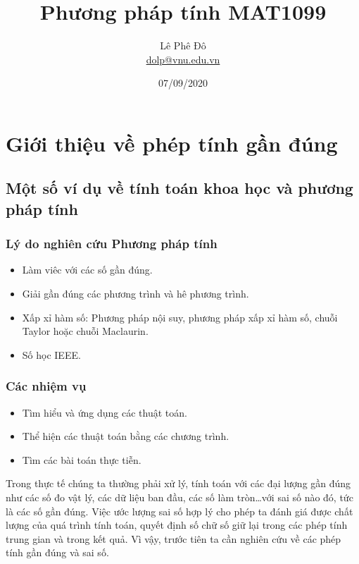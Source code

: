 \documentclass{article}    %
\author{Lê Phê Đô \\ \href{mailto:dolp@vnu.edu.vn}{dolp@vnu.edu.vn}}
\date{07/09/2020}
\title{Phương pháp tính MAT1099}
\def\blankpage{%
      \clearpage%
      \thispagestyle{empty}%
      \addtocounter{page}{-1}%
      \null%
      \clearpage}
\begin{document}
\maketitle

\blankpage

\section{Giới thiệu về phép tính gần đúng}

\subsection{Một số ví dụ về tính toán khoa học và phương pháp tính}

\subsubsection{Lý do nghiên cứu Phương pháp tính}

\begin{itemize}
    \item Làm viêc với các số gần đúng.
    \item Giải gần đúng các phương trình và hê phương trình.
    \item Xấp xỉ hàm số: Phương pháp nội suy, phương pháp xấp xỉ hàm số, chuỗi
    Taylor hoặc chuỗi Maclaurin.
    \item Số học IEEE.
\end{itemize}

\subsubsection{Các nhiệm vụ}

\begin{itemize}
    \item Tìm hiểu và ứng dụng các thuật toán.
    \item Thể hiện các thuật toán bằng các chương trình.
    \item Tìm các bài toán thực tiễn.
\end{itemize}

Trong thực tế chúng ta thường phải xử lý, tính toán với các đại lượng gần đúng
như các số đo vật lý, các dữ liệu ban đầu, các số làm tròn…với sai số nào đó,
tức là các số gần đúng. Việc ước lượng sai số hợp lý cho phép ta đánh giá được
chất lượng của quá trình tính toán, quyết định số chữ số giữ lại trong các phép
tính trung gian và trong kết quả. Vì vậy, trước tiên ta cần nghiên cứu về các
phép tính gần đúng và sai số.
\end{document}

